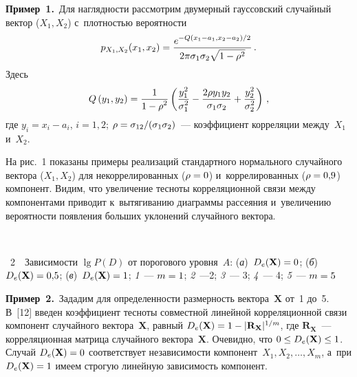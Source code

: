 \begin{multicols}{2}
  \noindent
  \textbf{Пример~1.}\ Для наглядности рас\-смот\-рим двумерный гауссовский 
случайный вектор ($X_1, X_2$) с~плот\-ностью ве\-ро\-ят\-ности
  \begin{equation}
   p_{X_1, X_2}(x_1, x_2) =\displaystyle\frac{\displaystyle e^{-Q(x_1-a_1, x_2-a_2)/2}\mathstrut}{\displaystyle 2\pi 
\sigma_1\sigma_2 \sqrt{1-\rho^2}\mathstrut}\,.
 \label{e4-t}
\end{equation}
Здесь
$$
  Q\left(y_1,y_2\right)=\displaystyle\frac{\displaystyle 1\mathstrut}{\displaystyle 1-\rho^2\mathstrut}\left( \displaystyle\frac{\displaystyle y_1^2\mathstrut}{\displaystyle \sigma_1^2\mathstrut} -\displaystyle\frac{\displaystyle 2\rho 
y_1y_2\mathstrut}{\displaystyle \sigma_1\sigma_2\mathstrut}+\displaystyle\frac{\displaystyle y_2^2\mathstrut}{\displaystyle \sigma_2^2\mathstrut}\right)\,,
$$
где $y_i=x_i-a_i$, $i=1, 2$; $\rho\hm= \sigma_{12}/(\sigma_1\sigma_2)$~--- 
коэффициент корреляции между~$X_1$ и~$X_2$.
  
  На рис.~1 показаны примеры реализаций стандартного нормального 
случайного вектора ($X_1, X_2$) для некоррелированных ($\rho\hm=0$) 
и~коррелированных ($\rho\hm = 0{,}9$) компонент. Видим, что увеличение 
тес\-но\-ты корреляционной связи между компонентами приводит к~вытягиванию 
диа\-грам\-мы рас\-се\-яния и~увеличению ве\-ро\-ят\-ности по\-яв\-ле\-ния больших 
укло\-не\-ний случайного век\-тора.
  
  
 
  { \begin{center}  %
 \vspace*{-2pt}
  \mbox{%
 \epsfxsize=78.141mm 
 }


\end{center}


\noindent
{{\figurename~2}\ \ \small{Зависимости $\lg P(D)$ от порогового уров\-ня~$A$: 
(\textit{а})~$D_e(\mathbf{X})\hm = 0$; (\textit{б})~$D_e(\mathbf{X}) \hm= 0{,}5$; 
(\textit{в})~$D_e(\mathbf{X}) \hm=1$; \textit{1}~--- $m \hm= 1$; 
\textit{2}~---2; 
\textit{3}~--- 3; \textit{4}~--- 4; \textit{5}~--- $m\hm= 5$}}
}

\vspace*{18pt}

\setcounter{figure}{2}

  
  \noindent
  \textbf{Пример~2.}\ Зададим для определенности раз\-мер\-ность 
вектора~$\mathbf{X}$ от~1 до~5. В~[12] введен коэффициент тес\-но\-ты 
со\-вмест\-ной линейной корреляционной связи компонент случайного 
век\-то\-ра~$\mathbf{X}$, равный $D_e(\mathbf{X})\hm=1\hm- \vert 
\mathbf{R}_{\mathbf{X}}\vert^{1/m}$, где $\mathbf{R}_{\mathbf{X}}$~--- 
корреляционная мат\-ри\-ца случайного век\-то\-ра~$\mathbf{X}$. Очевидно, что 
$0\hm\leq D_e(\mathbf{X})\hm\leq 1$. Случай $D_e(\mathbf{X})\hm=0$ 
соответствует не\-за\-ви\-си\-мости компонент~$X_1, X_2, \ldots , X_m$, а~при 
$D_e(\mathbf{X})\hm=1$ имеем строгую линейную за\-ви\-си\-мость компонент.
  

\end{multicols}
